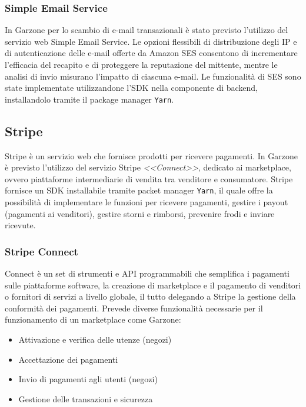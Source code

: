 \subsubsection{Simple Email Service} 
In Garzone per lo scambio di e-mail transazionali è stato previsto l'utilizzo del servizio web Simple Email Service. Le opzioni flessibili di distribuzione degli IP e di autenticazione delle e-mail offerte da Amazon SES consentono di incrementare l'efficacia del recapito e di proteggere la reputazione del mittente, mentre le analisi di invio misurano l'impatto di ciascuna e-mail\cite{SES}. Le funzionalità di SES sono state implementate utilizzandone l'SDK nella componente di backend, installandolo tramite il package manager \lstinline[basicstyle=\ttfamily]!Yarn!.
\subsection{Stripe}
Stripe è un servizio web che fornisce prodotti per ricevere pagamenti. In Garzone è previsto l'utilizzo del servizio Stripe \textit{<<Connect>>}, dedicato ai marketplace, ovvero piattaforme intermediarie di vendita tra venditore e consumatore. Stripe fornisce un SDK installabile tramite packet manager \lstinline[basicstyle=\ttfamily]!Yarn!, il quale offre la possibilità di implementare le funzioni per ricevere pagamenti, gestire i payout (pagamenti ai venditori), gestire storni e rimborsi, prevenire frodi e inviare ricevute.
\subsubsection{Stripe Connect}
Connect è un set di strumenti e API programmabili che semplifica i pagamenti sulle piattaforme software, la creazione di marketplace e il pagamento di venditori o fornitori di servizi a livello globale, il tutto delegando a Stripe la gestione della conformità dei pagamenti\cite{STRIPE}. Prevede diverse funzionalità necessarie per il funzionamento di un marketplace come Garzone:
\begin{itemize}
  \item Attivazione e verifica delle utenze (negozi)
  \item Accettazione dei pagamenti
  \item Invio di pagamenti agli utenti (negozi)
  \item Gestione delle transazioni e sicurezza
\end{itemize}